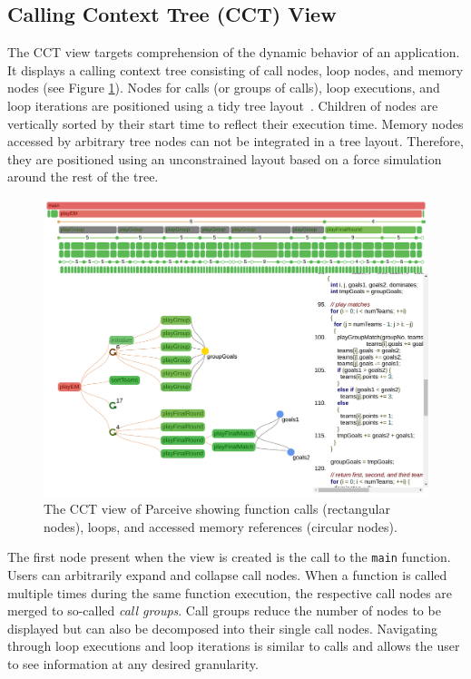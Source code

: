 \subsection{Calling Context Tree (CCT) View}
The CCT view targets comprehension of the dynamic behavior of an application.
It displays a calling context tree consisting of call nodes, loop nodes, and
memory nodes (see Figure \ref{fig:cct_view}). Nodes for calls (or groups of
calls), loop executions, and loop iterations are positioned using a tidy tree
layout~\cite{TidierTree}. Children of nodes are vertically sorted by their
start time to reflect their execution time. Memory nodes accessed by
arbitrary tree nodes can not be integrated in a tree layout. Therefore,
they are positioned using an unconstrained layout based on a force simulation
around the rest of the tree.

\begin{figure}[h!]
\includegraphics[clip, trim=0.9cm 2.5cm 8.5cm 8.5cm,
width=\linewidth]{img/cct_view}
\caption{The CCT view of Parceive showing function calls (rectangular nodes),
loops, and accessed memory references (circular nodes).}
\label{fig:cct_view}	
\end{figure}

The first node present when the view is created is the call to the
\texttt{main} function. Users can arbitrarily expand and collapse call nodes.
When a function is called multiple times during the same function execution,
the respective call nodes are merged to so-called \textit{call groups}. Call
groups reduce the number of nodes to be displayed but can also be decomposed
into their single call nodes. Navigating through loop executions and loop
iterations is similar to calls and allows the user to see information at any
desired granularity. 

